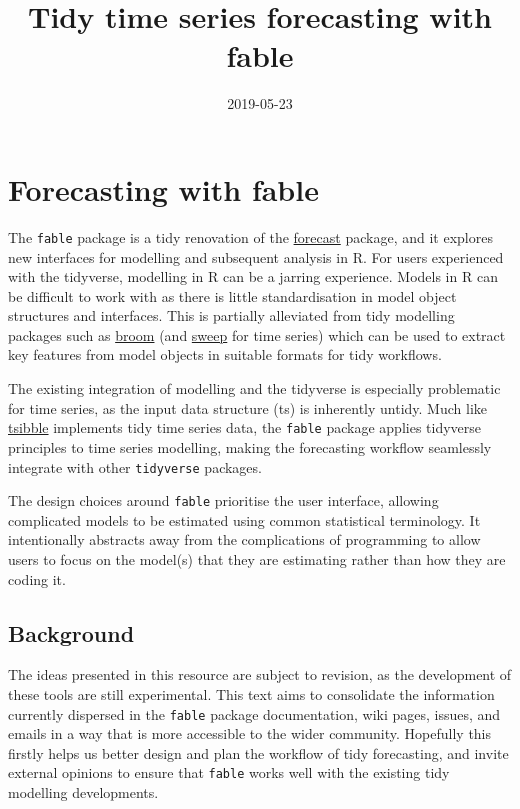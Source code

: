 \documentclass[]{book}
\title{Tidy time series forecasting with fable}
\author{}
\date{2019-05-23}
\begin{document}
\maketitle

{
\setcounter{tocdepth}{1}
\tableofcontents
}
\hypertarget{forecasting-with-fable}{%
\chapter{Forecasting with fable}\label{forecasting-with-fable}}

The \texttt{fable} package is a tidy renovation of the \href{https://github.com/robjhyndman/forecast/}{forecast} package, and it explores new interfaces for modelling and subsequent analysis in R. For users experienced with the tidyverse, modelling in R can be a jarring experience. Models in R can be difficult to work with as there is little standardisation in model object structures and interfaces. This is partially alleviated from tidy modelling packages such as \href{https://github.com/tidymodels/broom/}{broom} (and \href{https://github.com/business-science/sweep}{sweep} for time series) which can be used to extract key features from model objects in suitable formats for tidy workflows.

The existing integration of modelling and the tidyverse is especially problematic for time series, as the input data structure (ts) is inherently untidy. Much like \href{https://pkg.earo.me/tsibble/}{tsibble} implements tidy time series data, the \texttt{fable} package applies tidyverse principles to time series modelling, making the forecasting workflow seamlessly integrate with other \texttt{tidyverse} packages.

The design choices around \texttt{fable} prioritise the user interface, allowing complicated models to be estimated using common statistical terminology. It intentionally abstracts away from the complications of programming to allow users to focus on the model(s) that they are estimating rather than how they are coding it.

\hypertarget{background}{%
\section{Background}\label{background}}

The ideas presented in this resource are subject to revision, as the development of these tools are still experimental. This text aims to consolidate the information currently dispersed in the \texttt{fable} package documentation, wiki pages, issues, and emails in a way that is more accessible to the wider community. Hopefully this firstly helps us better design and plan the workflow of tidy forecasting, and invite external opinions to ensure that \texttt{fable} works well with the existing tidy modelling developments.
\end{document}
